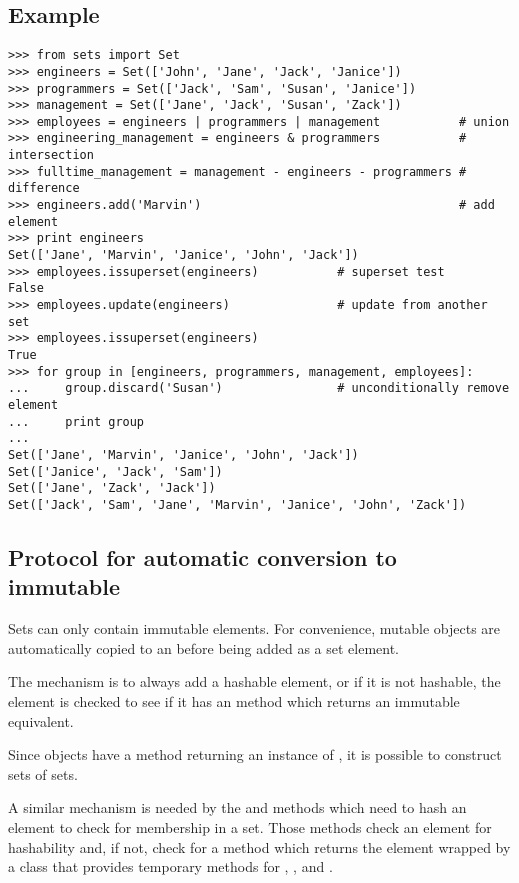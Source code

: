 \subsection{Example \label{set-example}}

\begin{verbatim}
>>> from sets import Set
>>> engineers = Set(['John', 'Jane', 'Jack', 'Janice'])
>>> programmers = Set(['Jack', 'Sam', 'Susan', 'Janice'])
>>> management = Set(['Jane', 'Jack', 'Susan', 'Zack'])
>>> employees = engineers | programmers | management           # union
>>> engineering_management = engineers & programmers           # intersection
>>> fulltime_management = management - engineers - programmers # difference
>>> engineers.add('Marvin')                                    # add element
>>> print engineers
Set(['Jane', 'Marvin', 'Janice', 'John', 'Jack'])
>>> employees.issuperset(engineers)           # superset test
False
>>> employees.update(engineers)               # update from another set
>>> employees.issuperset(engineers)
True
>>> for group in [engineers, programmers, management, employees]:
...     group.discard('Susan')                # unconditionally remove element
...     print group
...
Set(['Jane', 'Marvin', 'Janice', 'John', 'Jack'])
Set(['Janice', 'Jack', 'Sam'])
Set(['Jane', 'Zack', 'Jack'])
Set(['Jack', 'Sam', 'Jane', 'Marvin', 'Janice', 'John', 'Zack'])
\end{verbatim}


\subsection{Protocol for automatic conversion to immutable
            \label{immutable-transforms}}

Sets can only contain immutable elements.  For convenience, mutable
 objects are automatically copied to an 
before being added as a set element.

The mechanism is to always add a hashable element, or if it is not
hashable, the element is checked to see if it has an
 method which returns an immutable equivalent.

Since  objects have a  method
returning an instance of , it is possible to
construct sets of sets.

A similar mechanism is needed by the  and
 methods which need to hash an element to check
for membership in a set.  Those methods check an element for hashability
and, if not, check for a  method
which returns the element wrapped by a class that provides temporary
methods for , , and .

